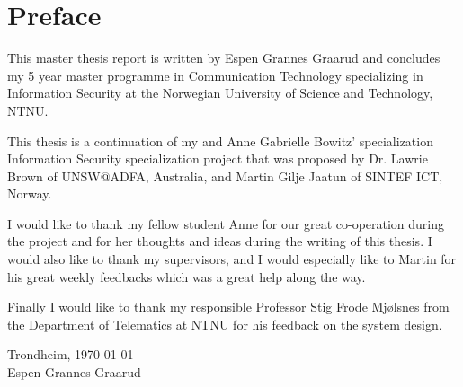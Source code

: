 \chapter*{Preface}

This master thesis report is written by Espen Grannes Graarud and concludes my 5
year master programme in Communication Technology specializing in Information
Security at the Norwegian University of Science and Technology, NTNU.

This thesis is a continuation of my and Anne Gabrielle Bowitz' specialization
Information Security specialization project that was proposed by Dr. Lawrie
Brown of UNSW@ADFA, Australia, and Martin Gilje Jaatun of SINTEF ICT, Norway.

I would like to thank my fellow student Anne for our great co-operation during
the project and for her thoughts and ideas during the writing of this thesis. I
would also like to thank my supervisors, and I would especially like to Martin
for his great weekly feedbacks which was a great help along the way.

Finally I would like to thank my responsible Professor Stig Frode Mj{\o}lsnes
from the Department of Telematics at NTNU for his feedback on the system design.

\begin{center}
\vspace{4cm}
\noindent Trondheim, \today
\vspace{2cm}
\\Espen Grannes Graarud
\end{center}
